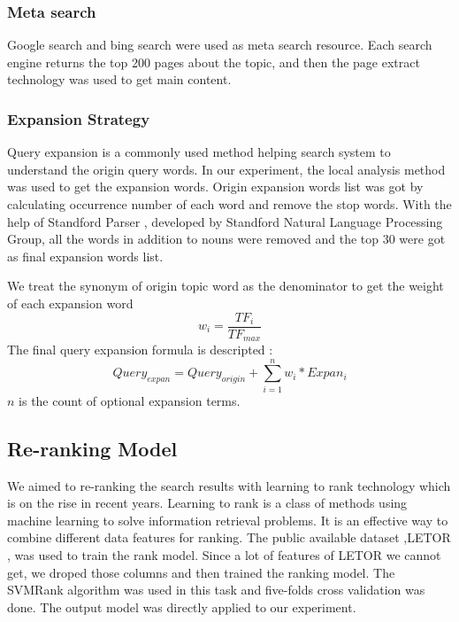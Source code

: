 \documentclass[runningheads,a4paper]{llncs}
\begin{document}
\subsubsection{Meta search}

Google search and bing search were used as meta search resource. Each search engine returns the top 200 pages about the topic, and then  the page extract technology \cite{2012-Lin-p256-264} was used to get main content.  

\subsubsection{Expansion Strategy}
Query expansion is a commonly used method helping search system to understand the origin query words. In our experiment, the local analysis \cite{2010-Imran-p386-393} method was used to get the expansion words. Origin expansion words list was got by calculating occurrence number of each word and remove the stop words. With the help of Standford Parser \cite{standfordparser} , developed by Standford Natural Language Processing Group, all the words in addition to nouns were removed and the top 30 were got as final expansion words list.

We treat the synonym of origin topic word as the denominator to get the weight of each expansion word
\begin{equation}
w_i = \frac{TF_i}{TF_{max}}
\end{equation}
The final query expansion formula is descripted : 
\begin{equation}
Query_{expan} = Query_{origin} + \sum_{i=1}^n w_i * Expan_i
\end{equation}
$n$ is the count of optional expansion terms.
\subsection{Re-ranking Model}

We aimed to re-ranking the search results with learning to rank technology which is on the rise in recent years. Learning to rank is a class of methods using machine learning to solve information retrieval problems. It is an effective way to combine different data features for ranking. The public available dataset ,LETOR \cite{2007-Liu-p3-10}, was used to train the rank model. Since a lot of features of LETOR we cannot get,  we droped those columns and  then trained the ranking model. The SVMRank \cite{2010-Chapelle-p201-215} algorithm was used in this task and five-folds cross validation was done. The output model was directly applied to our experiment.
\end{document}
